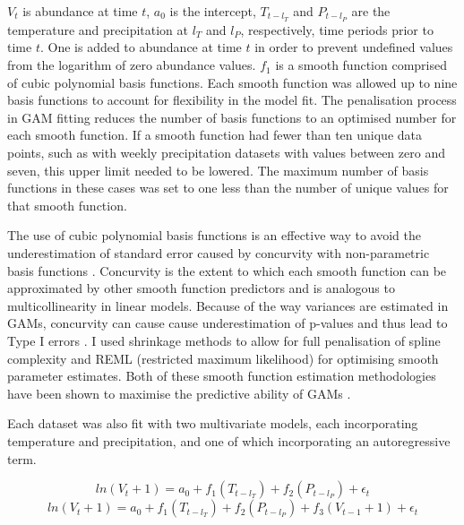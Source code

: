 $V_t$ is abundance at time $t$, $a_0$ is the intercept, $T_{t-l_T}$ and $P_{t-l_P}$ are the temperature and precipitation at $l_T$ and $l_P$, respectively, time periods prior to time $t$. One is added to abundance at time $t$ in order to prevent undefined values from the logarithm of zero abundance values. $f_1$ is a smooth function comprised of cubic polynomial basis functions. Each smooth function was allowed up to nine basis functions to account for flexibility in the model fit. The penalisation process in GAM fitting reduces the number of basis functions to an optimised number for each smooth function. If a smooth function had fewer than ten unique data points, such as with weekly precipitation datasets with values between zero and seven, this upper limit needed to be lowered. The maximum number of basis functions in these cases was set to one less than the number of unique values for that smooth function. 

The use of cubic polynomial basis functions is an effective way to avoid the underestimation of standard error caused by concurvity with non-parametric basis functions \citep{Dominici2002, Ramsay2003}. Concurvity is the extent to which each smooth function can be approximated by other smooth function predictors and is analogous to multicollinearity in linear models. Because of the way variances are estimated in GAMs, concurvity can cause cause underestimation of p-values and thus lead to Type I errors \citep{Ramsay2003}. I used shrinkage methods to allow for full penalisation of spline complexity and REML (restricted maximum likelihood) for optimising smooth parameter estimates. Both of these smooth function estimation methodologies have been shown to maximise the predictive ability of GAMs \citep{Marra2011}. 

Each dataset was also fit with two multivariate models, each incorporating temperature and precipitation, and one of which incorporating an autoregressive term.

\begin{equation}
	ln(V_t + 1) = a_0 + f_1(T_{t-l_T}) + f_2(P_{t-l_P}) + \epsilon_t
	\label{eq: multivariate1}
\end{equation}
\begin{equation}
	ln(V_t + 1) = a_0 + f_1(T_{t-l_T}) + f_2(P_{t-l_P}) + f_3(V_{t-1} + 1) + \epsilon_t
	\label{eq: multivariate2}
\end{equation}

